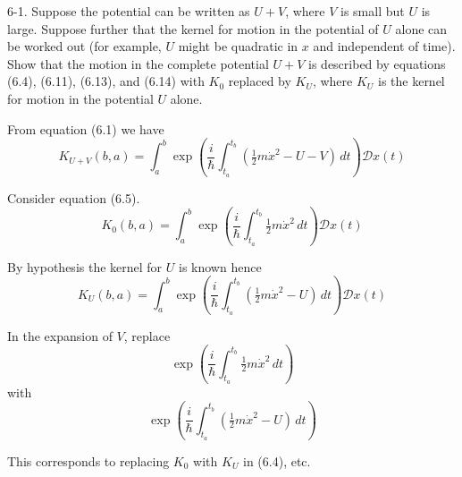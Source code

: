 \documentclass[12pt]{article}
\begin{document}
6-1.
Suppose the potential can be written as $U+V$,
where $V$ is small but $U$ is large.
Suppose further that the kernel for motion in the potential of $U$ alone
can be worked out (for example, $U$ might be quadratic in $x$ and
independent of time).
Show that the motion in the complete potential $U+V$ is described by
equations (6.4), (6.11), (6.13), and (6.14) with $K_0$ replaced by $K_U$,
where $K_U$ is the kernel for motion in the potential $U$ alone.

\bigskip
From equation (6.1) we have
\begin{equation*}
K_{U+V}(b,a)=\int_a^b
\exp\left(\frac{i}{\hbar}\int_{t_a}^{t_b}\left(\tfrac{1}{2}m\dot x^2-U-V\right)\,dt\right)
\mathcal Dx(t)
\end{equation*}

Consider equation (6.5).
\begin{equation*}
K_0(b,a)=\int_a^b\exp\left(\frac{i}{\hbar}\int_{t_a}^{t_b}\tfrac{1}{2}m\dot x^2\,dt\right)
\mathcal Dx(t)
\tag{6.5}
\end{equation*}

By hypothesis the kernel for $U$ is known hence
\begin{equation*}
K_U(b,a)=\int_a^b
\exp\left(\frac{i}{\hbar}\int_{t_a}^{t_b}\left(\tfrac{1}{2}m\dot x^2-U\right)\,dt\right)
\mathcal Dx(t)
\end{equation*}

In the expansion of $V$, replace
\begin{equation*}
\exp\left(\frac{i}{\hbar}\int_{t_a}^{t_b}\tfrac{1}{2}m\dot x^2\,dt\right)
\end{equation*}
with
\begin{equation*}
\exp\left(\frac{i}{\hbar}\int_{t_a}^{t_b}\left(\tfrac{1}{2}m\dot x^2-U\right)\,dt\right)
\end{equation*}

This corresponds to replacing $K_0$ with $K_U$ in (6.4), etc.
\end{document}
